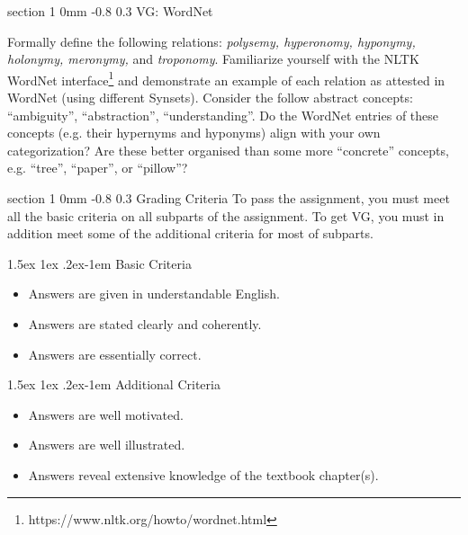 \documentclass[11pt]{article}
\makeatletter
\newenvironment{titlemize}[1]{%
    \paragraph{#1}
    \begin{itemize}
        \setlength\itemsep{0pt}}
    {\end{itemize}}
\renewcommand{\section}{\@startsection
{section}%
{1}%
{0mm}%
{-0.8\baselineskip}%
{0.3\baselineskip}%
{\bfseries\large}}%
\renewcommand{\paragraph}{%
  \@startsection{paragraph}{4}%
  {\z@}{1.5ex \@plus 1ex \@minus .2ex}{-1em}%
  {\normalfont\normalsize\bfseries}%
}\makeatother
\makeatother
\begin{document}
\clearpage

\section{VG: WordNet}

Formally define the following relations: \textit{polysemy, hyperonomy, hyponymy,
  holonymy, meronymy,} and \textit{troponomy}. Familiarize yourself with the NLTK WordNet interface\footnote{https://www.nltk.org/howto/wordnet.html} and demonstrate an example of each relation as attested in WordNet (using different Synsets). Consider the follow abstract concepts: “ambiguity”, “abstraction”, “understanding”. Do the WordNet entries of these concepts (e.g. their hypernyms and hyponyms) align with your own categorization? Are these better organised than some more “concrete” concepts, e.g. “tree”, “paper”, or “pillow”? 

\section{Grading Criteria}
To pass the assignment, you must meet all the basic criteria on all
subparts of the assignment.  To get VG, you must in addition meet some
of the additional criteria for most of subparts.

\begin{titlemize}{Basic Criteria}
    \item Answers are given in understandable English.
    \item Answers are stated clearly and coherently.
    \item Answers are essentially correct.
\end{titlemize}
\begin{titlemize}{Additional Criteria}
    \item Answers are well motivated.
    \item Answers are well illustrated.
    \item Answers reveal extensive knowledge of the textbook
      chapter(s).
\end{titlemize}

\end{document}
